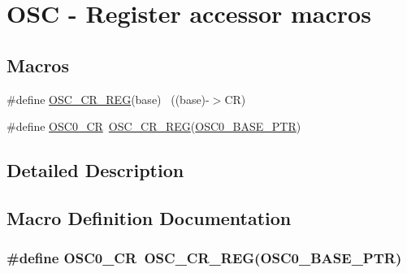 \hypertarget{group___o_s_c___register___accessor___macros}{}\section{O\+SC -\/ Register accessor macros}
\label{group___o_s_c___register___accessor___macros}
\subsection*{Macros}
\begin{DoxyCompactItemize}
\item 
\#define \hyperlink{group___o_s_c___register___accessor___macros_ga986cf8366f7686523f323c907f34222e}{O\+S\+C\+\_\+\+C\+R\+\_\+\+R\+EG}(base)                                              ~((base)-\/$>$CR)
\item 
\#define \hyperlink{group___o_s_c___register___accessor___macros_ga55e7ae8d61b1c66e1c673163c8c0a10e}{O\+S\+C0\+\_\+\+CR}~\hyperlink{group___o_s_c___register___accessor___macros_ga986cf8366f7686523f323c907f34222e}{O\+S\+C\+\_\+\+C\+R\+\_\+\+R\+EG}(\hyperlink{group___o_s_c___peripheral_gaab1618c69a91b2e5d3385139b5b566f0}{O\+S\+C0\+\_\+\+B\+A\+S\+E\+\_\+\+P\+TR})
\end{DoxyCompactItemize}


\subsection{Detailed Description}


\subsection{Macro Definition Documentation}
\subsubsection[{\texorpdfstring{O\+S\+C0\+\_\+\+CR}{OSC0_CR}}]{\setlength{\rightskip}{0pt plus 5cm}\#define O\+S\+C0\+\_\+\+CR~{\bf O\+S\+C\+\_\+\+C\+R\+\_\+\+R\+EG}({\bf O\+S\+C0\+\_\+\+B\+A\+S\+E\+\_\+\+P\+TR})}\hypertarget{group___o_s_c___register___accessor___macros_ga55e7ae8d61b1c66e1c673163c8c0a10e}{}\label{group___o_s_c___register___accessor___macros_ga55e7ae8d61b1c66e1c673163c8c0a10e}


